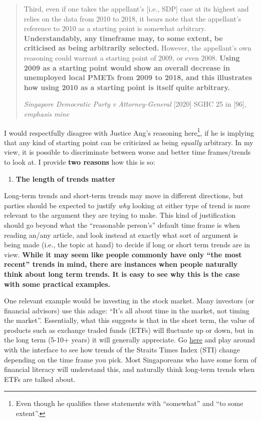 \documentclass[openany]{book}
\providecommand{\tightlist}{%
  \setlength{\itemsep}{0pt}\setlength{\parskip}{0pt}}
\let\rmarkdownfootnote\footnote%
\def\footnote{\protect\rmarkdownfootnote}
\begin{document}
\begin{quote}
Third, even if one takes the appellant's {[}i.e., SDP{]} case at its
highest and relies on the data from 2010 to 2018, it bears note that the
appellant's reference to 2010 as a starting point is somewhat arbitrary.
\textbf{Understandably, any timeframe may, to some extent, be criticised
as being arbitrarily selected.} However, the appellant's own reasoning
could warrant a starting point of 2009, or even 2008. \textbf{Using 2009
as a starting point would show an overall decrease in unemployed local
PMETs from 2009 to 2018, and this illustrates how using 2010 as a
starting point is itself quite arbitrary.}

\emph{Singapore Democratic Party v Attorney-General} {[}2020{]} SGHC 25
in {[}96{]}, \emph{emphasis mine}
\end{quote}

I would respectfully disagree with Justice Ang's reasoning
here\footnote{Even though he qualifies these statements with
  ``somewhat'' and ``to some extent''.}, if he is implying that any kind
of starting point can be criticized as being \emph{equally} arbitrary.
In my view, it is possible to discriminate between worse and better time
frames/trends to look at. I provide \textbf{two reasons} how this is so:

\begin{enumerate}
\def\labelenumi{\arabic{enumi}.}
\tightlist
\item
  \textbf{The length of trends matter}
\end{enumerate}

Long-term trends and short-term trends may move in different directions,
but parties should be expected to justify \emph{why} looking at either
type of trend is more relevant to the argument they are trying to make.
This kind of justification should go beyond what the ``reasonable
person's'' default time frame is when reading an/any article, and look
instead at exactly what sort of argument is being made (i.e., the topic
at hand) to decide if long or short term trends are in view.
\textbf{While it may seem like people commonly have only ``the most
recent'' trends in mind, there are instances when people naturally think
about long term trends. It is easy to see why this is the case with some
practical examples.}

One relevant example would be investing in the stock market. Many
investors (or financial advisors) use this adage: ``It's all about time
in the market, not timing the market''. Essentially, what this suggests
is that in the short term, the value of products such as exchange traded
funds (ETFs) will fluctuate up or down, but in the long term (5-10+
years) it will generally appreciate. Go
\href{https://www2.sgx.com/indices/products/sti}{here} and play around
with the interface to see how trends of the Straits Times Index (STI)
change depending on the time frame you pick. Most Singaporeans who have
some form of financial literacy will understand this, and naturally
think long-term trends when ETFs are talked about.
\end{document}
